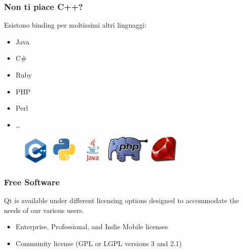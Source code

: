 \documentclass[10pt]{beamer}
\begin{document}
\begin{frame}
	\frametitle{Non ti piace C++?}
	\begin{block}{}
		Esistono binding per moltissimi altri linguaggi:
		\begin{itemize}
			\item Java
			\item C\#
			\item Ruby
			\item PHP
			\item Perl
			\item \dots
		\end{itemize}
	\end{block}
	\vspace{0.5cm}
	\begin{figure}
		\includegraphics[height=1.4cm]{images/cplusplus.png}
		\qquad
		\includegraphics[height=1.4cm]{images/python.png}
		\qquad
		\includegraphics[height=1.4cm]{images/java.png}
		\qquad
		\includegraphics[height=1.4cm]{images/php.png}
		\qquad
		\includegraphics[height=1.4cm]{images/ruby.png}
	\end{figure}	
\end{frame}

\begin{frame}
	\frametitle{Free Software}
	Qt is available under different licensing options designed to accommodate the needs of our various users.
	\begin{itemize}
		\item Enterprise, Professional, and Indie Mobile licenses
		\item Community license (GPL or LGPL versions 3 and 2.1)
	\end{itemize}
\end{frame}
\end{document}
